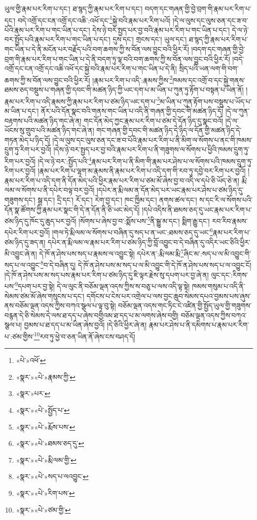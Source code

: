 ཡུལ་གྱི་རྣམ་པར་རིག་པ་དང་། ཐ་སྙད་ཀྱི་རྣམ་པར་རིག་པ་དང་། བདག་དང་གཞན་གྱི་བྱེ་བྲག་གི་རྣམ་པར་རིག་པ་དང་། བདེ་འགྲོ་དང་ངན་འགྲོ་དང་འཆི་:འཕོ་དང་\footnote{«པེ་»འཕོ་}སྐྱེ་བའི་རྣམ་པར་རིག་པའོ། །དེ་ལ་ལུས་དང་ལུས་ཅན་དང་ཟ་བ་པོའི་རྣམ་པར་རིག་པ་གང་ཡིན་པ་དང་། དེས་ཉེ་བར་སྤྱད་པར་བྱ་བའི་རྣམ་པར་རིག་པ་གང་ཡིན་པ་དང་། དེ་ལ་ཉེ་བར་སྤྱོད་པའི་རྣམ་པར་རིག་པ་གང་ཡིན་པ་དང་། དུས་དང་། གྲངས་དང་། ཡུལ་དང་། ཐ་སྙད་ཀྱི་རྣམ་པར་རིག་པ་གང་ཡིན་པ་དེ་ནི་མངོན་པར་བརྗོད་པའི་བག་ཆགས་ཀྱི་ས་བོན་ལས་བྱུང་བའི་ཕྱིར་རོ། །བདག་དང་གཞན་གྱི་བྱེ་བྲག་གི་རྣམ་པར་རིག་པ་གང་ཡིན་པ་དེ་ནི་བདག་ཏུ་ལྟ་བའི་བག་ཆགས་ཀྱི་ས་བོན་ལས་བྱུང་བའི་ཕྱིར་རོ། །བདེ་འགྲོ་དང་ངན་འགྲོ་དང་འཆི་འཕོ་དང་སྐྱེ་བའི་རྣམ་པར་རིག་པ་གང་ཡིན་པ་དེ་ནི། སྲིད་པའི་ཡན་ལག་གི་བག་ཆགས་ཀྱི་ས་བོན་ལས་བྱུང་བའི་ཕྱིར་རོ། །རྣམ་པར་རིག་པ་འདི་:རྣམས་ཀྱིས་\footnote{«སྣར་»«པེ་»རྣམས་ཀྱི་}ཁམས་དང་འགྲོ་བ་དང་སྐྱེ་གནས་ཐམས་ཅད་བསྡུས་པ་གཞན་གྱི་དབང་གི་མཚན་ཉིད་ཀྱི་ཡང་དག་པ་མ་ཡིན་པ་ཀུན་ཏུ་རྟོག་པ་བསྟན་པ་ཡིན་ནོ། །རྣམ་པར་རིག་པ་འདི་རྣམས་ཀྱི་རྣམ་པར་རིག་པ་ཙམ་ཉིད་ཡང་དག་པ་\footnote{«སྣར་»པར་}མ་ཡིན་པ་ཀུན་རྟོག་པས་བསྡུས་པ་ཡོད་པ་མ་ཡིན་པ་དང་། ནོར་པའི་དོན་སྣང་བའི་གནས་གང་ཡིན་པ་འདི་ནི་གཞན་གྱི་དབང་གི་མཚན་ཉིད་དོ། །དེ་ལ་ཀུན་བརྟགས་པའི་མཚན་ཉིད་གང་ཞེ་ན། གང་དོན་མེད་ཀྱང་རྣམ་པར་རིག་པ་ཙམ་དེ་དོན་ཉིད་དུ་སྣང་བའོ། །དེ་ལ་ཡོངས་སུ་གྲུབ་པའི་མཚན་ཉིད་གང་ཞེ་ན། གང་གཞན་གྱི་དབང་གི་མཚན་ཉིད་དེ་ཉིད་ལ་དོན་གྱི་མཚན་ཉིད་དེ་གཏན་མེད་པ་ཉིད་དོ། །དེ་ལ་ལུས་དང་ལུས་ཅན་དང་ཟ་བ་པོའི་རྣམ་པར་རིག་པ་ནི་མིག་ལ་སོགས་པ་ནང་གི་ཁམས་དྲུག་ཏུ་རིག་པར་བྱའོ། །དེས་ཉེ་བར་སྤྱད་པར་བྱ་བའི་རྣམ་པར་རིག་པ་ནི་གཟུགས་ལ་སོགས་པ་ཕྱིའི་ཁམས་དྲུག་ཏུ་རིག་པར་བྱའོ། །དེ་ལ་ཉེ་བར་:སྤྱོད་པའི་\footnote{«སྣར་»«པེ་»སྤྱོད་པ་}རྣམ་པར་རིག་པ་ནི་མིག་གི་རྣམ་པར་ཤེས་པ་ལ་སོགས་པའི་ཁམས་དྲུག་ཏུ་རིག་པར་བྱའོ། །རྣམ་པར་རིག་པ་ལྷག་མ་རྣམས་ནི་རྣམ་པར་རིག་པ་འདི་དག་གི་རབ་ཏུ་དབྱེ་བར་རིག་པར་བྱའོ། །རྣམ་པར་རིག་པ་འདི་དག་ནི་དོན་མེད་པའི་ཕྱིར་རྣམ་པར་རིག་པ་ཙམ་མོ་ཞེས་བྱ་བ་འདི་ལ་དཔེ་ཅི་ཡོད་ཅེ་ན། རྨི་ལམ་ལ་སོགས་པ་ནི་དཔེར་བལྟ་བར་བྱའོ། །དཔེར་ན་རྨི་ལམ་ན་དོན་མེད་པར་ཡང་རྣམ་པར་ཤེས་པ་ཙམ་ཉིད་དུ་གཟུགས་དང་། སྒྲ་དང་། དྲི་དང་། རོ་དང་། རེག་བྱ་དང་། ཁང་ཁྱིམ་དང་། ནགས་ཚལ་དང་། ས་དང་རི་ལ་སོགས་པའི་དོན་སྣ་ཚོགས་ཀྱི་རྣམ་པར་སྣང་གི་དེ་ན་དོན་ནི་ཅི་ཡང་མེད་དོ། །དཔེ་འདིས་ནི་ཐམས་ཅད་དུ་ཡང་རྣམ་པར་རིག་པ་ཙམ་ཉིད་དུ་ཁོང་དུ་ཆུད་པར་བྱའོ། །སོགས་པ་ཞེས་བྱ་བ་:སྨོས་པས་\footnote{«སྣར་»«པེ་»རྨོས་པས་}ནི་སྒྱུ་མ་དང་། སྨིག་རྒྱུ་དང་། རབ་རིབ་རྣམས་དཔེར་རིག་པར་བྱའོ། །གལ་ཏེ་རྨི་ལམ་ལ་སོགས་པ་བཞིན་དུ་སད་པ་ན་ཡང་:ཐམས་ཅད་དུ་ཡང་\footnote{«སྣར་»«པེ་»ཐམས་ཅད་དུ་}རྣམ་པར་རིག་པ་ཙམ་ཉིད་དུ་ཟད་ན། དཔེར་ན་རྨི་ལམ་ལ་རྣམ་པར་རིག་པ་ཙམ་ཉིད་ཀྱི་བློ་འབྱུང་བ་དེ་བཞིན་དུ་འདིར་ཡང་ཅིའི་ཕྱིར་མི་འབྱུང་ཞེ་ན། དེ་ཁོ་ན་ཤེས་པས་སད་པ་རྣམས་ལ་འབྱུང་སྟེ། དཔེར་ན་:རྨི་ལམ་རྨི་\footnote{«སྣར་»«པེ་»རྨི་ལམ་གྱི་}ཞིང་མ་:སད་པ་ལ་མི་འབྱུང་གི་སད་པ་ལ་འབྱུང་\footnote{«སྣར་»«པེ་»སད་པ་ལའབྱུང་}བ་དེ་བཞིན་དུ། དེ་ཁོ་ན་ཤེས་པས་མ་སད་པ་ལ་མི་འབྱུང་གི་དེ་ཁོ་ན་ཤེས་པས་སད་པ་ལ་འབྱུང་ངོ། །དེ་ཁོ་ན་ཤེས་པས་མ་སད་པས་རྣམ་པར་རིག་པ་ཙམ་ཉིད་དུ་ཇི་ལྟར་རྗེས་སུ་དཔག་པར་བྱ་ཞེ་ན། ལུང་དང་:རིགས་པས་\footnote{«སྣར་»«པེ་»རིག་པས་}དཔག་པར་བྱ་སྟེ། དེ་ལ་ལུང་ནི་བཅོམ་ལྡན་འདས་ཀྱིས་ས་བཅུ་པ་ལས་འདི་ལྟ་སྟེ། ཁམས་གསུམ་པ་འདི་ནི་སེམས་ཙམ་མོ་ཞེས་གསུངས་པ་དང་། དགོངས་པ་ངེས་པར་འགྲེལ་པ་ལས་བྱང་ཆུབ་སེམས་དཔའ་བྱམས་པས་ཞུས་ནས་བཅོམ་ལྡན་འདས་ཀྱིས་བཀའ་སྩལ་པ་ལྟ་བུ་སྟེ། བཅོམ་ལྡན་འདས་གང་ཏིང་ངེ་འཛིན་གྱི་སྤྱོད་ཡུལ་གྱི་གཟུགས་བརྙན་དེ་ཅི་སེམས་དེ་ལས་ཐ་དད་པ་ཞེས་བགྱིའམ་ཐ་དད་པ་མ་ལགས་ཞེས་བགྱི། བཅོམ་ལྡན་འདས་ཀྱིས་བཀའ་སྩལ་པ། བྱམས་པ་ཐ་དད་པ་མ་ཡིན་ཞེས་བྱའོ། །དེ་ཅིའི་ཕྱིར་ཞེ་ན། རྣམ་པར་ཤེས་པ་ནི་དམིགས་པ་རྣམ་པར་རིག་པ་:ཙམ་གྱིས་\footnote{«སྣར་»«པེ་»ཙམ་གྱི་}རབ་ཏུ་ཕྱེ་བ་ཅན་ཡིན་ནོ་ཞེས་ངས་བཤད་དོ། 
